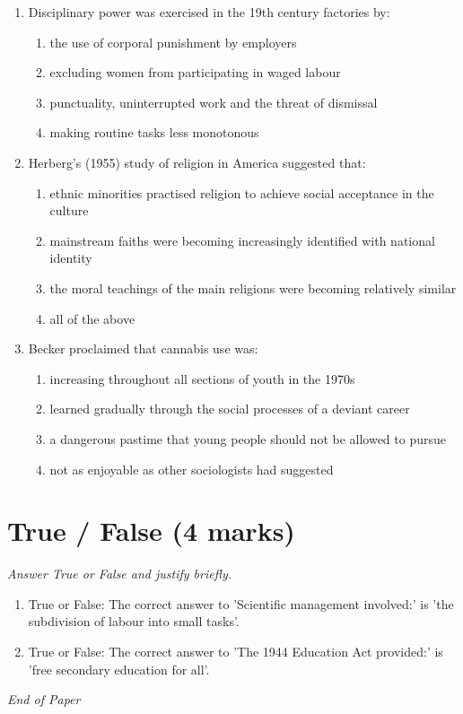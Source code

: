 \documentclass[12pt]{article}
\begin{document}
\begin{enumerate}[label=\arabic*.]
\begin{enumerate}[label=(\alph*)]
\end{enumerate}
\item Disciplinary power was exercised in the 19th century factories by:
\begin{enumerate}[label=(\alph*)]
    \item the use of corporal punishment by employers
    \item excluding women from participating in waged labour
    \item punctuality, uninterrupted work and the threat of dismissal
    \item making routine tasks less monotonous
\end{enumerate}
\item Herberg's (1955) study of religion in America suggested that:
\begin{enumerate}[label=(\alph*)]
    \item ethnic minorities practised religion to achieve social acceptance in the culture
    \item mainstream faiths were becoming increasingly identified with national identity
    \item the moral teachings of the main religions were becoming relatively similar
    \item all of the above
\end{enumerate}
\item Becker proclaimed that cannabis use was:
\begin{enumerate}[label=(\alph*)]
    \item increasing throughout all sections of youth in the 1970s
    \item learned gradually through the social processes of a deviant career
    \item a dangerous pastime that young people should not be allowed to pursue
    \item not as enjoyable as other sociologists had suggested
\end{enumerate}
\end{enumerate}

\section*{True / False (4 marks)}
\textit{Answer True or False and justify briefly.}
\begin{enumerate}[label=\arabic*.]
\item True or False: The correct answer to 'Scientific management involved:' is 'the subdivision of labour into small tasks'.
\item True or False: The correct answer to 'The 1944 Education Act provided:' is 'free secondary education for all'.
\end{enumerate}

\vfill
\noindent\textit{End of Paper}
\end{document}
